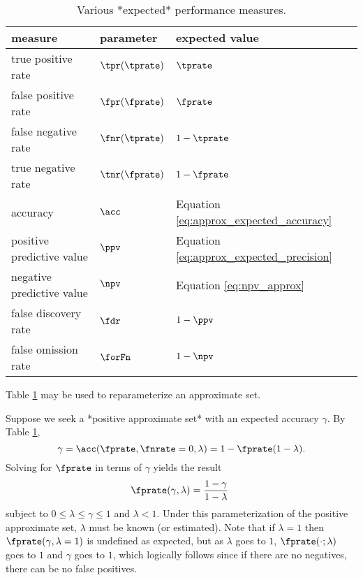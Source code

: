 \documentclass[
]{article}
\begin{document}
\begin{table}
    \centering
    \caption{Various *expected* performance measures.}
    \label{tbl:perf_sum}    
    \begin{tabular}{@{} l l l @{}}
        \toprule
        \textbf{measure} & \textbf{parameter} & \textbf{expected value}\\
        \midrule
        true positive rate & $\tpr(\tprate)$ & $\tprate$\\
        false positive rate & $\fpr(\fprate)$ & $\fprate$\\
        false negative rate & $\fnr(\tprate)$ & $1-\tprate$\\
        true negative rate & $\tnr(\fprate)$ & $1-\fprate$\\
        accuracy & $\acc$ & Equation \ref{eq:approx_expected_accuracy}\\        
        positive predictive value & $\ppv$ & Equation \ref{eq:approx_expected_precision}\\
        negative predictive value & $\npv$ & Equation \ref{eq:npv_approx}\\        
        false discovery rate & $\fdr$ & $1-\ppv$\\
        false omission rate & $\forFn$ & $1-\npv$\\
        \bottomrule
    \end{tabular}
\end{table}

Table \ref{tbl:perf_sum} may be used to reparameterize an approximate
set.

\begin{example}
Suppose we seek a *positive approximate set* with an expected accuracy 
$\gamma$. By Table \ref{tbl:perf_sum},
$$
\gamma = \acc(\fprate,\fnrate=0,\lambda) = 1 - \fprate(1 - \lambda).
$$
Solving for $\fprate$ in terms of $\gamma$ yields the result
$$
\fprate(\gamma, \lambda) = \frac{1 - \gamma}{1 - \lambda}\
$$
subject to $0 \leq \lambda \leq \gamma \leq 1$ and $\lambda < 1$.
Under this parameterization of the  positive approximate set, $\lambda$ 
must be known (or estimated).
Note that if $\lambda = 1$ then $\fprate(\gamma, \lambda=1)$ is undefined as expected, but as $\lambda$ goes to $1$, $\fprate(\cdot; \lambda)$ goes to $1$ and $\gamma$ goes to $1$, which logically follows since if there are no negatives, there can be no false positives.
\end{example}
\end{document}

